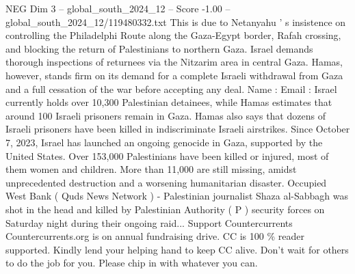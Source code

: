 \begin{textsample}{NEG Dim 3 – global\_south\_2024\_12 – Score -1.00 – global\_south\_2024\_12/119480332.txt}
This is due to Netanyahu ' s insistence on controlling the Philadelphi Route along the Gaza-Egypt border, Rafah crossing, and blocking the return of Palestinians to northern Gaza.
Israel demands thorough inspections of returnees via the Nitzarim area in central Gaza.
Hamas, however, stands firm on its demand for a complete Israeli withdrawal from Gaza and a full cessation of the war before accepting any deal.
Name : Email : Israel currently holds over 10,300 Palestinian detainees, while Hamas estimates that around 100 Israeli prisoners remain in Gaza.
Hamas also says that dozens of Israeli prisoners have been killed in indiscriminate Israeli airstrikes.
Since October 7, 2023, Israel has launched an ongoing genocide in Gaza, supported by the United States.
Over 153,000 Palestinians have been killed or injured, most of them women and children.
More than 11,000 are still missing, amidst unprecedented destruction and a worsening humanitarian disaster.
Occupied West Bank ( Quds News Network ) - Palestinian journalist Shaza al-Sabbagh was shot in the head and killed by Palestinian Authority ( P ) security forces on Saturday night during their ongoing raid...
Support Countercurrents Countercurrents.org is on annual fundraising drive.
CC is 100 \% reader supported.
Kindly lend your helping hand to keep CC alive.
Don't wait for others to do the job for you.
Please chip in with whatever you can.

\end{textsample}
